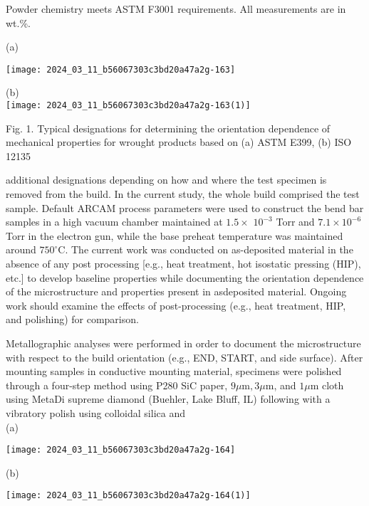\documentclass[10pt]{article}
\begin{document}
Powder chemistry meets ASTM F3001 requirements. All measurements are in wt.\%.

(a)

\begin{center}
\texttt{[image: 2024\_03\_11\_b56067303c3bd20a47a2g-163]}
\end{center}

(b)\\
\texttt{[image: 2024\_03\_11\_b56067303c3bd20a47a2g-163(1)]}

Fig. 1. Typical designations for determining the orientation dependence of mechanical properties for wrought products based on (a) ASTM E399, (b) ISO 12135

additional designations depending on how and where the test specimen is removed from the build. In the current study, the whole build comprised the test sample. Default ARCAM process parameters were used to construct the bend bar samples in a high vacuum chamber maintained at $1.5 \times$ $10^{-3}$ Torr and $7.1 \times 10^{-6}$ Torr in the electron gun, while the base preheat temperature was maintained around $750^{\circ} \mathrm{C}$. The current work was conducted on as-deposited material in the absence of any post processing [e.g., heat treatment, hot isostatic pressing (HIP), etc.] to develop baseline properties while documenting the orientation dependence of the microstructure and properties present in asdeposited material. Ongoing work should examine the effects of post-processing (e.g., heat treatment, HIP, and polishing) for comparison.

Metallographic analyses were performed in order to document the microstructure with respect to the build orientation (e.g., END, START, and side surface). After mounting samples in conductive mounting material, specimens were polished through a four-step method using P280 SiC paper, $9 \mu \mathrm{m}, 3 \mu \mathrm{m}$, and $1 \mu \mathrm{m}$ cloth using MetaDi supreme diamond (Buehler, Lake Bluff, IL) following with a vibratory polish using colloidal silica and\\
(a)

\begin{center}
\texttt{[image: 2024\_03\_11\_b56067303c3bd20a47a2g-164]}
\end{center}

(b)

\begin{center}
\texttt{[image: 2024\_03\_11\_b56067303c3bd20a47a2g-164(1)]}
\end{center}
\end{document}

